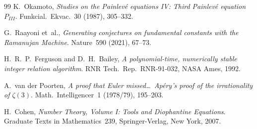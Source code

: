 \documentclass[11pt,a4paper]{article}
\theoremstyle{definition}
\theoremstyle{remark}
\begin{document}
\begin{thebibliography}{99}
K.~Okamoto, \emph{Studies on the Painlev\'e equations IV: Third
Painlev\'e equation $P_{III}$}. Funkcial.~Ekvac.~30 (1987), 305--332.

G.~Raayoni et~al., \emph{Generating conjectures on fundamental constants
with the Ramanujan Machine}.
Nature~590 (2021), 67--73.

H.~R.~P.~Ferguson and D.~H.~Bailey, \emph{A polynomial-time, numerically
stable integer relation algorithm}. RNR Tech.\ Rep.\ RNR-91-032, NASA
Ames, 1992.

A.~van der Poorten, \emph{A proof that Euler missed\ldots\ Ap\'ery's proof
of the irrationality of $\zeta(3)$}. Math.~Intelligencer~1 (1978/79),
195--203.

H.~Cohen, \emph{Number Theory, Volume I: Tools and Diophantine
Equations}. Graduate Texts in Mathematics~239, Springer-Verlag, New
York, 2007.

\end{thebibliography}
\end{document}
